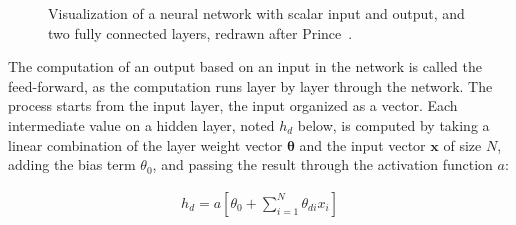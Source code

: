 \documentclass[english,twoside,openright]{UH_DS_MSc}
\begin{document}
\begin{figure}[ht]
    \centering
\caption{Visualization of a neural network with scalar input and output, and two fully connected layers, redrawn after Prince~\cite{princebook}.}
\label{image:neuralnet}
\end{figure}


The computation of an output based on an input in the network is called the 
feed-forward, as the computation runs layer by layer through the 
network. The process starts from the input layer, the input 
organized as a vector. Each intermediate value on a hidden layer, noted $h_d$ below,
is computed by taking a linear combination of the layer weight vector $\mathbf{\theta}$ and 
the input vector $\mathbf{x}$ of size $N$, adding the 
bias term $\theta_0$, and passing the result through the activation function $a$:

\begin{align}
    h_d = a\left[ \theta_{0} + \sum_{i=1}^{N}\theta_{di}x_{i} \right]
\label{eq:fc_layer}
\end{align}
\end{document}
